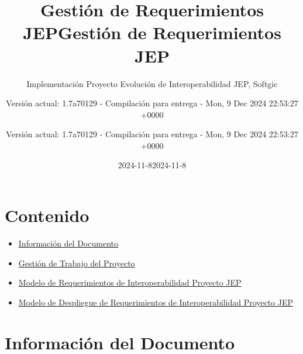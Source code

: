 \documentclass[
  paper=a4,
  ,captions=tableheading
]{scrartcl}
\title{Gestión de Requerimientos JEP}
\subtitle{Implementación Proyecto Evolución de Interoperabilidad JEP,
Softgic}
\author{Versión actual: 1.7a70129 - Compilación para entrega - Mon, 9
Dec 2024 22:53:27 +0000}
\date{2024-11-8}
\title{Gestión de Requerimientos JEP}
\author{Versión actual: 1.7a70129 - Compilación para entrega - Mon, 9
Dec 2024 22:53:27 +0000}
\date{2024-11-8}
\providecommand{\tightlist}{%
  \setlength{\itemsep}{0pt}\setlength{\parskip}{0pt}}
\begin{document}
\begin{titlepage}
\newcommand{\colorRule}[3][black]{\textcolor[HTML]{#1}{\rule{#2}{#3}}}
\end{titlepage}
\restoregeometry
{}




\section{Contenido}\label{sec:contenido}

\begin{itemize}
\tightlist
\item
  \hyperref[informaciuxf3n-del-documento]{Información del Documento}
\item
  \hyperref[gestiuxf3n-de-trabajo-del-proyecto]{Gestión de Trabajo del
  Proyecto}
\item
  \hyperref[modelo-de-requerimientos-de-interoperabilidad-proyecto-jep]{Modelo
  de Requerimientos de Interoperabilidad Proyecto JEP}
\item
  \hyperref[modelo-de-despliegue-de-requerimientos-de-interoperabilidad-proyecto-jep]{Modelo
  de Despliegue de Requerimientos de Interoperabilidad Proyecto JEP}
\end{itemize}

\newpage

\section{Información del
Documento}\label{sec:informaciuxf3n-del-documento}
\end{document}
